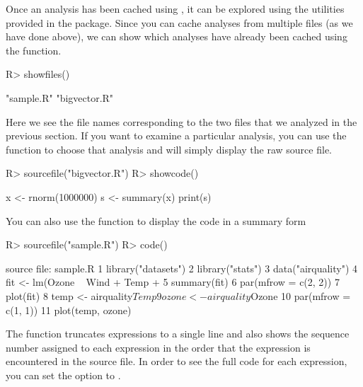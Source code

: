 \documentclass[nojss]{jss}
\begin{document}
Once an analysis has been cached using , it can be
explored using the utilities provided in the  package.
Since you can cache analyses from multiple files (as we have done
above), we can show which analyses have already been cached using the
 function.
\begin{Schunk}
\begin{Sinput}
R> showfiles()
\end{Sinput}
\begin{Soutput}
[1] "sample.R"    "bigvector.R"
\end{Soutput}
\end{Schunk}
Here we see the file names corresponding to the two files that we
analyzed in the previous section.  If you want to examine a particular
analysis, you can use the  function to choose that
analysis and  will simply display the raw source file.
\begin{Schunk}
\begin{Sinput}
R> sourcefile("bigvector.R")
R> showcode()
\end{Sinput}
\begin{Soutput}
x <- rnorm(1000000)
s <- summary(x)
print(s)
\end{Soutput}
\end{Schunk}
You can also use the  function to display the code in a
summary form
\begin{Schunk}
\begin{Sinput}
R> sourcefile("sample.R")
R> code()
\end{Sinput}
\begin{Soutput}
source file: sample.R
1  library("datasets")
2  library("stats")
3  data("airquality")
4  fit <- lm(Ozone ~ Wind + Temp + 
5  summary(fit)
6  par(mfrow = c(2, 2))
7  plot(fit)
8  temp <- airquality$Temp
9  ozone <- airquality$Ozone
10  par(mfrow = c(1, 1))
11  plot(temp, ozone)
\end{Soutput}
\end{Schunk}
The  function truncates expressions to a single line and
also shows the sequence number assigned to each expression in the
order that the expression is encountered in the source file.  In order
to see the full code for each expression, you can set the  option to .
\end{document}
